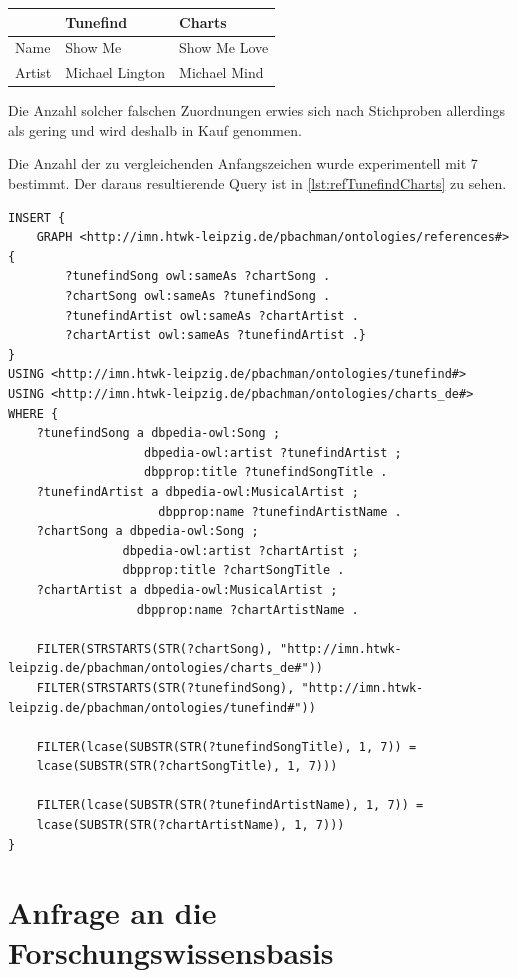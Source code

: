 \documentclass[parskip]{scrartcl}
\begin{document}
\begin{tabular}{p{}|p{}|p{}}
    & \textbf{Tunefind} & \textbf{Charts} \\\hline
    Name & Show Me  & Show Me Love\\
    Artist & Michael Lington & Michael Mind\\
\end{tabular}

Die Anzahl solcher falschen Zuordnungen erwies sich nach Stichproben allerdings als gering und wird deshalb in Kauf genommen.

Die Anzahl der zu vergleichenden Anfangszeichen wurde experimentell mit 7 bestimmt. Der daraus resultierende Query ist in \autoref{lst:refTunefindCharts} zu sehen.

\begin{lstlisting}[caption={SPARQL-Query zur Referenzierung von Tunefind und Charts}, label={lst:refTunefindCharts}]
INSERT {
    GRAPH <http://imn.htwk-leipzig.de/pbachman/ontologies/references#> { 
        ?tunefindSong owl:sameAs ?chartSong .
        ?chartSong owl:sameAs ?tunefindSong .        
        ?tunefindArtist owl:sameAs ?chartArtist .
        ?chartArtist owl:sameAs ?tunefindArtist .}
}
USING <http://imn.htwk-leipzig.de/pbachman/ontologies/tunefind#>
USING <http://imn.htwk-leipzig.de/pbachman/ontologies/charts_de#>
WHERE {
    ?tunefindSong a dbpedia-owl:Song ;
                   dbpedia-owl:artist ?tunefindArtist ;
                   dbpprop:title ?tunefindSongTitle .
    ?tunefindArtist a dbpedia-owl:MusicalArtist ;
                     dbpprop:name ?tunefindArtistName .
    ?chartSong a dbpedia-owl:Song ;
                dbpedia-owl:artist ?chartArtist ;
                dbpprop:title ?chartSongTitle .
    ?chartArtist a dbpedia-owl:MusicalArtist ;
                  dbpprop:name ?chartArtistName .
    
    FILTER(STRSTARTS(STR(?chartSong), "http://imn.htwk-leipzig.de/pbachman/ontologies/charts_de#"))
    FILTER(STRSTARTS(STR(?tunefindSong), "http://imn.htwk-leipzig.de/pbachman/ontologies/tunefind#"))
    
    FILTER(lcase(SUBSTR(STR(?tunefindSongTitle), 1, 7)) =
    lcase(SUBSTR(STR(?chartSongTitle), 1, 7)))
    
    FILTER(lcase(SUBSTR(STR(?tunefindArtistName), 1, 7)) =
    lcase(SUBSTR(STR(?chartArtistName), 1, 7)))
}
\end{lstlisting}


\section{Anfrage an die Forschungswissensbasis}
\end{document}
